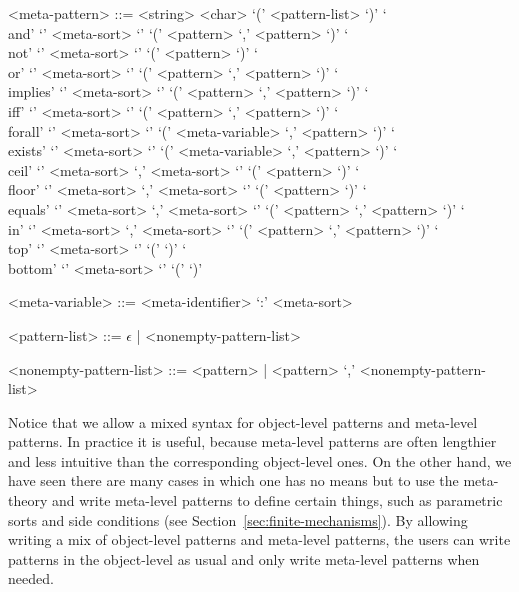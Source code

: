 \documentclass[UTF8,11pt]{article}
\theoremstyle{plain}
\theoremstyle{definition}
\theoremstyle{remark}
\DeclarePairedDelimiter{\ceil}{\lceil}{\rceil}
\DeclarePairedDelimiter{\floor}{\lfloor}{\rfloor}
\begin{document}
\begin{grammar}
 <meta-pattern> ::= \quad
    \alt <string>
    \alt <char>
  `(' <pattern-list> `)'
 \alt `\\and' `{' <meta-sort> `}'
 `(' <pattern> `,' <pattern> `)'
 \alt `\\not' `{' <meta-sort> `}'
 `(' <pattern> `)'
 \alt `\\or' `{' <meta-sort> `}'
 `(' <pattern> `,' <pattern> `)'
 \alt `\\implies' `{' <meta-sort> `}'
 `(' <pattern> `,' <pattern> `)'
 \alt `\\iff' `{' <meta-sort> `}'
 `(' <pattern> `,' <pattern> `)'
 \alt `\\forall' `{' <meta-sort> `}'
 `(' <meta-variable> `,' <pattern> `)'
 \alt `\\exists' `{' <meta-sort> `}'
 `(' <meta-variable> `,' <pattern> `)'
 \alt `\\ceil' `{' <meta-sort> `,' <meta-sort> `}'
 `(' <pattern> `)'
 \alt `\\floor' `{' <meta-sort> `,' <meta-sort> `}'
 `(' <pattern> `)'
 \alt `\\equals' `{' <meta-sort> `,' <meta-sort> `}'
 `(' <pattern> `,' <pattern> `)'
 \alt `\\in' `{' <meta-sort> `,' <meta-sort> `}'
 `(' <pattern> `,' <pattern> `)'
 \alt `\\top' `{' <meta-sort> `}' `(' `)'
 \alt `\\bottom' `{' <meta-sort> `}' `(' `)'

 <meta-variable> ::= <meta-identifier> `:' <meta-sort>

 <pattern-list> ::= $\epsilon$ | <nonempty-pattern-list>

 <nonempty-pattern-list> ::= <pattern> | <pattern> `,'
 <nonempty-pattern-list>
\end{grammar}
Notice that we allow a mixed syntax for object-level patterns and meta-level
patterns.
In practice it is useful, because meta-level patterns are often lengthier and
less intuitive than the corresponding object-level ones.
On the other hand, we have seen there are many cases in which one has no means
but to use the meta-theory and write meta-level patterns to define certain
things, such as parametric sorts and side conditions (see
Section~\ref{sec:finite-mechanisms}).
By allowing writing a mix of object-level patterns and meta-level patterns, the
users can write patterns in the object-level as usual and only write meta-level
patterns when needed.
\end{document}
